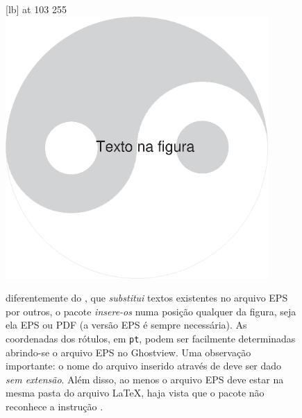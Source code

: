 \documentclass[a4paper,12pt]{article}
\begin{document}
	\begin{figure}		
		\small
		\hair 1pt
		 at 103 255
		\endlabellist
		\centering
		\includegraphics[width=10cm]{Tei-Gi}
		\caption{diferentemente do , que \emph{substitui} textos existentes no arquivo EPS por outros, o pacote  \emph{insere-os} numa posição qualquer da figura, seja ela EPS ou PDF (a versão EPS é sempre necessária). As coordenadas dos rótulos, em \texttt{pt}, podem ser facilmente determinadas abrindo-se o arquivo EPS no Ghostview. Uma observação importante: o nome do arquivo inserido através de  deve ser dado \emph{sem extensão}. Além disso, ao menos o arquivo EPS deve estar na mesma pasta do arquivo \LaTeX, haja vista que o pacote  não reconhece a instrução .}
	\end{figure}
	
\end{document}
